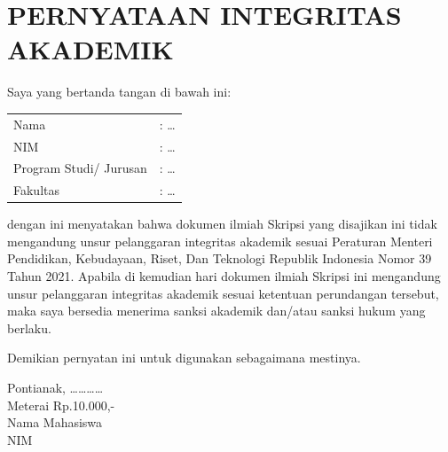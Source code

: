 \chapter*{PERNYATAAN INTEGRITAS AKADEMIK}
\thispagestyle{empty}
\noindent Saya yang bertanda tangan di bawah ini: \\
\begin{tabular}{@{}ll}
Nama & : \dots \\
NIM & : \dots \\
Program Studi/ Jurusan & : \dots \\
Fakultas & : \dots \\
\end{tabular}

\vspace{0.5cm}
\noindent dengan ini menyatakan bahwa dokumen ilmiah Skripsi yang disajikan ini tidak mengandung unsur pelanggaran integritas akademik sesuai Peraturan Menteri Pendidikan, Kebudayaan, Riset, Dan Teknologi Republik Indonesia Nomor 39 Tahun 2021. Apabila di kemudian hari dokumen ilmiah Skripsi ini mengandung unsur pelanggaran integritas akademik sesuai ketentuan perundangan tersebut, maka saya bersedia menerima sanksi akademik dan/atau sanksi hukum yang berlaku.

\vspace{0.5cm}
\noindent Demikian pernyatan ini untuk digunakan sebagaimana mestinya.

\vspace{1cm}
\begin{flushright}
\begin{minipage}{5cm}
\begin{singlespace}
Pontianak, \dots\dots\dots\dots \\[1.5cm]
Meterai Rp.10.000,- \\
Nama Mahasiswa \\
NIM
\end{singlespace}
\end{minipage}
\end{flushright}
